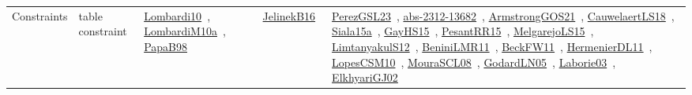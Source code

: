 {\begin{longtable}{lp{3cm}>{\raggedright\arraybackslash}p{6cm}>{\raggedright\arraybackslash}p{6cm}>{\raggedright\arraybackslash}p{8cm}}
Constraints & table constraint & \href{works/Lombardi10.pdf}{Lombardi10}~\cite{Lombardi10}, \href{works/LombardiM10a.pdf}{LombardiM10a}~\cite{LombardiM10a}, \href{works/PapaB98.pdf}{PapaB98}~\cite{PapaB98} & \href{works/JelinekB16.pdf}{JelinekB16}~\cite{JelinekB16} & \href{works/PerezGSL23.pdf}{PerezGSL23}~\cite{PerezGSL23}, \href{works/abs-2312-13682.pdf}{abs-2312-13682}~\cite{abs-2312-13682}, \href{works/ArmstrongGOS21.pdf}{ArmstrongGOS21}~\cite{ArmstrongGOS21}, \href{works/CauwelaertLS18.pdf}{CauwelaertLS18}~\cite{CauwelaertLS18}, \href{works/Siala15a.pdf}{Siala15a}~\cite{Siala15a}, \href{works/GayHS15.pdf}{GayHS15}~\cite{GayHS15}, \href{works/PesantRR15.pdf}{PesantRR15}~\cite{PesantRR15}, \href{works/MelgarejoLS15.pdf}{MelgarejoLS15}~\cite{MelgarejoLS15}, \href{works/LimtanyakulS12.pdf}{LimtanyakulS12}~\cite{LimtanyakulS12}, \href{works/BeniniLMR11.pdf}{BeniniLMR11}~\cite{BeniniLMR11}, \href{works/BeckFW11.pdf}{BeckFW11}~\cite{BeckFW11}, \href{works/HermenierDL11.pdf}{HermenierDL11}~\cite{HermenierDL11}, \href{works/LopesCSM10.pdf}{LopesCSM10}~\cite{LopesCSM10}, \href{works/MouraSCL08.pdf}{MouraSCL08}~\cite{MouraSCL08}, \href{works/GodardLN05.pdf}{GodardLN05}~\cite{GodardLN05}, \href{works/Laborie03.pdf}{Laborie03}~\cite{Laborie03}, \href{works/ElkhyariGJ02.pdf}{ElkhyariGJ02}~\cite{ElkhyariGJ02}\\
\end{longtable}
}

